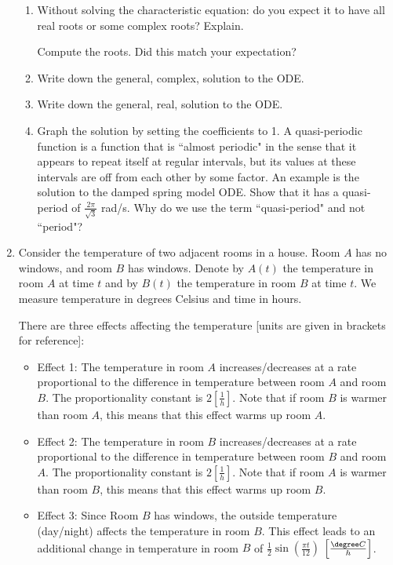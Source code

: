 \begin{enumerate}
\begin{enumerate}
        \item Without solving the characteristic equation: do you expect it to have all real roots or some complex roots? Explain.

        Compute the roots. Did this match your expectation?

        \item Write down the general, complex, solution to the ODE.

        \item Write down the general, real, solution to the ODE.

        \item Graph the solution by setting the coefficients to 1. A quasi-periodic function is a function that is ``almost periodic" in the sense that it appears to repeat itself at regular intervals, but its values at these intervals are off from each other by some factor. An example is the solution to the damped spring model ODE. Show that it has a quasi-period of $\frac{2\pi}{\sqrt{3}}$ rad/s. Why do we use the term ``quasi-period" and not ``period"?
    \end{enumerate}
    

    \item 
    Consider the temperature of two adjacent rooms in a house. Room $A$ has no windows, and room $B$ has windows. Denote by $A(t)$ the temperature in room $A$ at time $t$ and by $B(t)$ the temperature in room $B$ at time $t$. We measure temperature in degrees Celsius and time in hours.
    
    There are three effects affecting the temperature [units are given in brackets for reference]:
    \begin{itemize}[nosep,itemsep=2mm,topsep=2mm]
    	\item Effect 1: The temperature in room $A$ increases/decreases at a rate proportional to the difference in temperature between room $A$ and room $B$. The proportionality constant is $2\left[\frac{1}{h}\right]$. Note that if room $B$ is warmer than room $A$, this means that this effect warms up room $A$.
    	\item Effect 2: The temperature in room $B$ increases/decreases at a rate proportional to the difference in temperature between room $B$ and room $A$. The proportionality constant is $2\left[\frac{1}{h}\right]$. Note that if room $A$ is warmer than room $B$, this means that this effect warms up room $B$.
    	\item Effect 3: Since Room $B$ has windows, the outside temperature (day/night) affects the temperature in room $B$. This effect leads to an additional change in temperature in room $B$ of $\frac12\sin \left(\frac{\pi t}{12}\right)$ $\left[\frac{\degree C}{h}\right]$.
    \end{itemize}


\end{enumerate}
